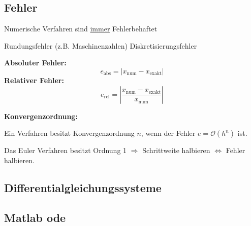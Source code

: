 \subsection{Fehler}
Numerische Verfahren sind \underline{immer} Fehlerbehaftet
\begin{outline}
    \1 Rundungsfehler (z.B. Maschinenzahlen)
    \1 Diskretisierungsfehler
\end{outline}
\textbf{Absoluter Fehler:}
\begin{equation*}
    e_{\text{abs}} = \left| x_{\text{num}} - x_{\text{exakt}} \right|
\end{equation*}
\textbf{Relativer Fehler:}
\begin{equation*}
    e_{\text{rel}} = \left| \frac{x_{\text{num}} - x_{\text{exakt}}}
                            {x_{\text{num}}}\right|
\end{equation*}
\begin{center}
\end{center}

\textbf{Konvergenzordnung:}

Ein Verfahren besitzt Konvergenzordnung $n$, wenn der Fehler $e =
\mathcal{O}\left( h^n \right)$ ist.

Das Euler Verfahren besitzt Ordnung 1 $\Rightarrow$ Schrittweite halbieren
$\Leftrightarrow$ Fehler halbieren.

\subsection{Differentialgleichungssysteme}
\subsection{Matlab ode}
